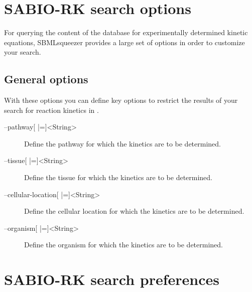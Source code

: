 \section{SABIO-RK search options}
\label{sec:SABIO_search_options}

For querying the content of the \SABIO database for experimentally determined
kinetic equations, SBMLsqueezer provides a large set of options in order to
customize your search.

\subsection{General options}

With these options you can define key options to restrict the results of
your search for reaction kinetics in \SABIO.
\begin{description}
\item[--pathway{[} |={]}<String>]
  Define the pathway for which the kinetics are to be determined.

\item[--tissue{[} |={]}<String>]
  Define the tissue for which the kinetics are to be determined.

\item[--cellular-location{[} |={]}<String>]
  Define the cellular location for which the kinetics are to be
  determined.

\item[--organism{[} |={]}<String>]
  Define the organism for which the kinetics are to be determined.
\end{description}

\section{SABIO-RK search preferences}
\label{sec:SABIO_search_preferences}

